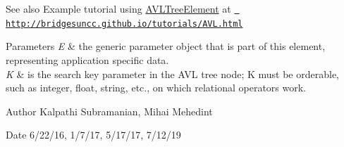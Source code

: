 \begin{DoxySeeAlso}{See also}
Example tutorial using \mbox{\hyperlink{classbridges_1_1base_1_1_a_v_l_tree_element}{A\+V\+L\+Tree\+Element}} at \href{http://bridgesuncc.github.io/tutorials/AVL.html}{\texttt{ http\+://bridgesuncc.\+github.\+io/tutorials/\+A\+V\+L.\+html}}
\end{DoxySeeAlso}

\begin{DoxyParams}{Parameters}
{\em E} & the generic parameter object that is part of this element, representing application specific data. \\
\hline
{\em K} & is the search key parameter in the A\+VL tree node; K must be orderable, such as integer, float, string, etc., on which relational operators work.\\
\hline
\end{DoxyParams}
\begin{DoxyAuthor}{Author}
Kalpathi Subramanian, Mihai Mehedint
\end{DoxyAuthor}
\begin{DoxyDate}{Date}
6/22/16, 1/7/17, 5/17/17, 7/12/19 
\end{DoxyDate}

